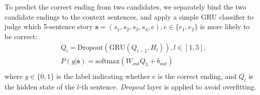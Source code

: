 To predict the correct ending from two candidates,
we separately bind the two candidate endings to the context sentences,
and apply a simple GRU classifier to judge
which 5-sentence story $\textbf{s}=(s_1, s_2, s_3, s_4, e),e\in\{e_1,e_2\}$
is more likely to be correct:
\begin{equation}
  \begin{aligned}
   &Q_l = \textrm{Dropout}(\textrm{GRU}(Q_{l-1}, H_l)), l \in [1, 5], \\
   &P(y|\textbf{s}) = \textrm{softmax}(W_{out} Q_5 + b_{out})\\
\end{aligned}
\end{equation}
where $y \in \{0, 1\}$ is the label indicating whether $e$ is the
correct ending, and $Q_l$ is the hidden state of the $l$-th sentence.
{\em Dropout} layer is applied to avoid overfitting.
